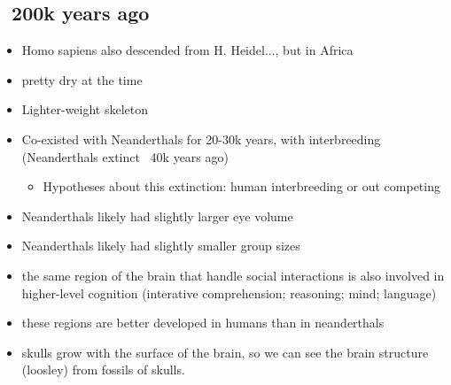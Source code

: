 \documentclass{article}
\theoremstyle{definition}
\begin{document}
\subsection{~200k years ago}
\begin{itemize}
	\item Homo sapiens also descended from H. Heidel..., but in Africa
	\item pretty dry at the time
	\item Lighter-weight skeleton
	\item Co-existed with Neanderthals for 20-30k years, with interbreeding (Neanderthals extinct  ~40k years ago)
		\begin{itemize}
			\item Hypotheses about this extinction: human interbreeding or out competing
		\end{itemize}
	\item Neanderthals likely had slightly larger eye volume
	\item Neanderthals likely had slightly smaller group sizes
	\item the same region of the brain that handle social interactions is also involved in higher-level cognition (interative comprehension; reasoning; mind; language)
	\item these regions are better developed in humans than in neanderthals
	\item skulls grow with the surface of the brain, so we can see the brain structure (loosley) from fossils of skulls. 
\end{itemize}
\end{document}
